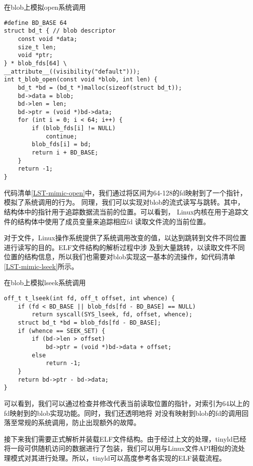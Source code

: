 \begin{listing}
\caption{在blob上模拟open系统调用}
\label{LST-mimic-open}
\begin{verbatim}
#define BD_BASE 64
struct bd_t { // blob descriptor
    const void *data;
    size_t len;
    void *ptr;
} * blob_fds[64] \
__attribute__((visibility("default")));
int t_blob_open(const void *blob, int len) {
    bd_t *bd = (bd_t *)malloc(sizeof(struct bd_t));
    bd->data = blob;
    bd->len = len;
    bd->ptr = (void *)bd->data;
    for (int i = 0; i < 64; i++) {
        if (blob_fds[i] != NULL)
            continue;
        blob_fds[i] = bd;
        return i + BD_BASE;
    }
    return -1;
}
\end{verbatim}
\end{listing}

代码清单\ref{LST-mimic-open}中，我们通过将区间为64-128的fd映射到了一个指针，模拟了系统调用的行为。
同理，我们可以实现对blob的流式读写与跳转。其中，结构体\tkey{bt\_t}中的\tkey{ptr}指针用于追踪数据流当前的位置。可以看到，
Linux内核在用于追踪文件的结构体\tkey{struct file}中\cite{StructFilePos}使用了\tkey{f\_pos}成员变量来追踪相应fd
读取文件流的当前位置。

对于文件，Linux操作系统提供了系统调用改变的值，以达到跳转到文件不同位置进行读写的目的。ELF文件结构的解析过程中涉
及到大量跳转，以读取文件不同位置的结构信息，所以我们也需要对blob实现这一基本的流操作，如代码清单\ref{LST-mimic-lseek}所示。

\begin{listing}
\caption{在blob上模拟lseek系统调用}
\label{LST-mimic-lseek}
\begin{verbatim}
off_t t_lseek(int fd, off_t offset, int whence) {
    if (fd < BD_BASE || blob_fds[fd - BD_BASE] == NULL)
        return syscall(SYS_lseek, fd, offset, whence);
    struct bd_t *bd = blob_fds[fd - BD_BASE];
    if (whence == SEEK_SET) {
        if (bd->len > offset)
            bd->ptr = (void *)bd->data + offset;
        else
            return -1;
    }
    return bd->ptr - bd->data;
}
\end{verbatim}
\end{listing}

可以看到，我们可以通过检查并修改代表当前读取位置的指针，对索引为64以上的fd映射到的blob实现功能。同时，我们还透明地将
对没有映射到blob的fd的\tkey{lseek}调用回落至常规的系统调用，防止出现额外的故障。

接下来我们需要正式解析并装载ELF文件结构。由于经过上文的处理，tinyld已经将一段可供随机访问的数据进行了包装，我们可以用与Linux文件API相似的流处
理模式对其进行处理。所以，tinyld可以高度参考各\tterm{glibc}实现的ELF装载流程。

